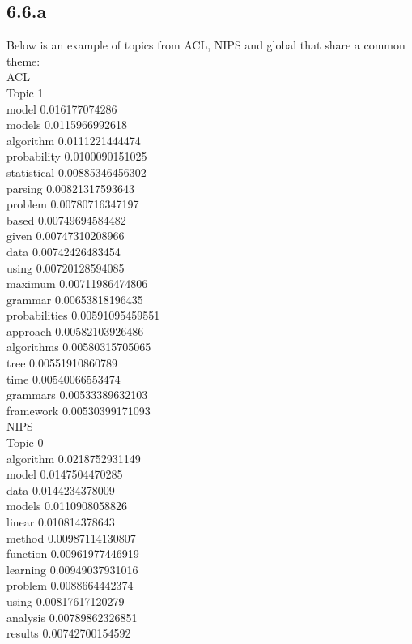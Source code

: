 \documentclass{article}
\begin{document}
\subsection*{6.6.a}
Below is an example of topics from ACL, NIPS and global that share a common theme:\\
ACL\\
Topic 1\\
model 0.016177074286\\
models 0.0115966992618\\
algorithm 0.0111221444474\\
probability 0.0100090151025\\
statistical 0.00885346456302\\
parsing 0.00821317593643\\
problem 0.00780716347197\\
based 0.00749694584482\\
given 0.00747310208966\\
data 0.00742426483454\\
using 0.00720128594085\\
maximum 0.00711986474806\\
grammar 0.00653818196435\\
probabilities 0.00591095459551\\
approach 0.00582103926486\\
algorithms 0.00580315705065\\
tree 0.00551910860789\\
time 0.00540066553474\\
grammars 0.00533389632103\\
framework 0.00530399171093\\
NIPS\\
Topic 0\\
algorithm 0.0218752931149\\
model 0.0147504470285\\
data 0.0144234378009\\
models 0.0110908058826\\
linear 0.010814378643\\
method 0.00987114130807\\
function 0.00961977446919\\
learning 0.00949037931016\\
problem 0.0088664442374\\
using 0.00817617120279\\
analysis 0.00789862326851\\
results 0.00742700154592\\
\end{document}
